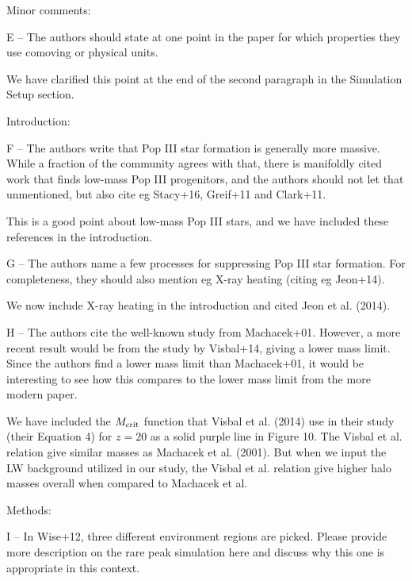 \documentclass[11pt]{article}
\newenvironment{referee}[1][]{%
    \ignorespaces%
    \begin{mdframed}[style=myquotestyle,#1]%
}{%
    \end{mdframed}%
    \ignorespacesafterend%
}%
\begin{document}
\begin{referee}
Minor comments:

E -- The authors should state at one point in the paper for which properties they use comoving or physical units.
\end{referee}
We have clarified this point at the end of the second paragraph in the Simulation Setup section.

\begin{referee}
Introduction:

F -- The authors write that Pop III star formation is generally more massive. While a fraction of the community agrees with that, there is manifoldly cited work that finds low-mass Pop III progenitors, and the authors should not let that unmentioned, but also cite eg Stacy+16, Greif+11 and Clark+11.
\end{referee}

This is a good point about low-mass Pop III stars, and we have included these references in the introduction.

\begin{referee}
G -- The authors name a few processes for suppressing Pop III star formation. For completeness, they should also mention eg X-ray heating (citing eg Jeon+14).
\end{referee}

We now include X-ray heating in the introduction and cited Jeon et al. (2014).

\begin{referee}
H -- The authors cite the well-known study from Machacek+01. However, a more recent result would be from the study by Visbal+14, giving a lower mass limit. Since the authors find a lower mass limit than Machacek+01, it would be interesting to see how this compares to the lower mass limit from the more modern paper.
\end{referee}

We have included the $M_{\rm crit}$ function that Visbal et al. (2014) use in their study (their Equation 4) for $z=20$ as a solid purple line in Figure 10. The Visbal et al. relation give similar masses as Machacek et al. (2001).  But when we input the LW background utilized in our study, the Visbal et al. relation give higher halo masses overall when compared to Machacek et al.

\begin{referee}
Methods:

I -- In Wise+12, three different environment regions are picked. Please provide more description on the rare peak simulation here and discuss why this one is appropriate in this context.
\end{referee}
\end{document}
